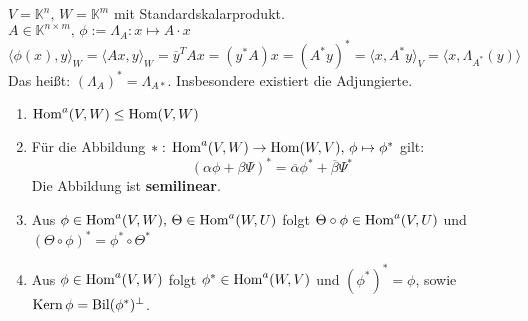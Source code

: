 \documentclass[parskip,a4paper,twoside,DIV15,BCOR12mm]{scrbook}
\begin{document}
\begin{example}
\(V=\mathbb{K}^{n},\,W=\mathbb{K}^{m}\) mit Standardskalarprodukt.\\
\(A\in\mathbb{K}^{n\times m},\,\phi:=\Lambda_{A}:x\mapsto A\cdot x\)
\[
\langle\phi(x),y\rangle_{W}=\langle Ax,y\rangle_{W}=\overline{y}^{T}Ax=
(y^{*}A)x=(A^{*}y)^{*}=\langle x,A^{*}y\rangle_{V}=\langle x,\Lambda_{A^{*}}(y)\rangle
\]
Das heißt: \((\Lambda_{A})^{*}=\Lambda_{A*}\). Insbesondere existiert die 
Adjungierte.
\end{example}
\begin{proposition}
\begin{enumerate}
\item \(\operatorname{Hom}^{a}(V,W)\leq\operatorname{Hom}(V,W)\)
\item Für die Abbildung \(*:\,\operatorname{Hom}^{a}(V,W)\to\operatorname{Hom}(W,V),\,\phi\mapsto\phi^{*}\)
gilt:
\[
(\alpha\phi+\beta\Psi)^{*}=\overline{\alpha}\phi^{*}+\overline{\beta}\Psi^{*}
\]
Die Abbildung ist \textbf{semilinear}.
\item Aus \(\phi\in\operatorname{Hom}^{a}(V,W),\,\Theta\in\operatorname{Hom}^{a}(W,U)\) folgt
\(
\Theta\circ\phi\in\operatorname{Hom}^{a}(V,U)
\)
und
\(
(\Theta\circ\phi)^{*}=\phi^{*}\circ\Theta^{*}
\)
\item Aus \(\phi\in\operatorname{Hom}^{a}(V,W)\) folgt \(\phi^{*}\in\operatorname{Hom}^{a}(W,V)\) und
\((\phi^{*})^{*}=\phi\), sowie \(\operatorname{Kern}\phi=\operatorname{Bil}(\phi^{*})^{\bot}\).
\end{enumerate}
\end{proposition}
\end{document}
